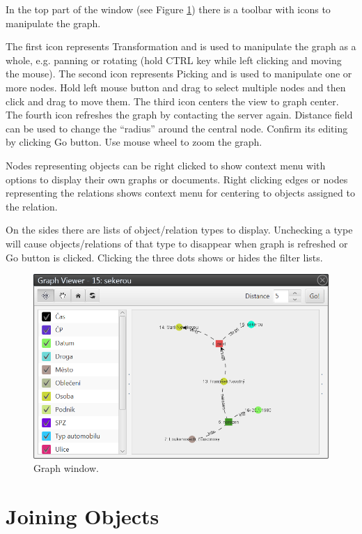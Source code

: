 In the top part of the window (see Figure \ref{fig:Graph}) there is a toolbar
with icons to manipulate the graph.

The first icon represents Transformation and is used to manipulate the graph as
a whole, e.g. panning or rotating (hold CTRL key while left clicking and moving
the mouse). The second icon represents Picking and is used to manipulate one or
more nodes. Hold left mouse button and drag to select multiple nodes and then
click and drag to move them. The third icon centers the view to graph center.
The fourth icon refreshes the graph by contacting the server again. Distance
field can be used to change the ``radius'' around the central node. Confirm its
editing by clicking Go button. Use mouse wheel to zoom the graph.

Nodes representing objects can be right clicked to show context menu with
options to display their own graphs or documents. Right clicking edges or
nodes representing the relations shows context menu for centering to objects
assigned to the relation.

On the sides there are lists of object/relation types to display. Unchecking
a type will cause objects/relations of that type to disappear when graph is
refreshed or Go button is clicked. Clicking the three dots shows or hides the
filter lists.

\begin{figure}[!htb]
        \centering
        \includegraphics[width=\textwidth]{Images/graph}
        \caption{Graph window.}
        \label{fig:Graph}
\end{figure}

\section{Joining Objects}
\label{ssec:JoinObjects}

